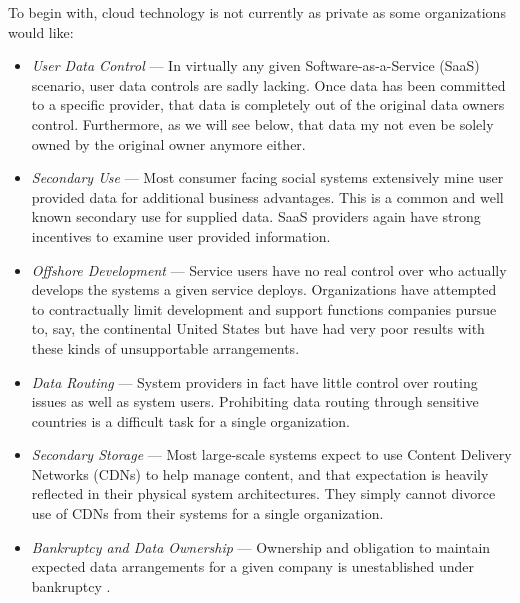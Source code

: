 \documentclass[12pt,letterpaper]{article}
\begin{document}
To begin with, cloud technology is not currently as private as some organizations would like:
\begin{itemize}
\item \textit{User Data Control} --- In virtually any given Software-as-a-Service (SaaS) scenario, user data controls are sadly lacking.  Once data has been committed to a specific provider, that data is completely out of the original data owners control.  Furthermore, as we will see below, that data my not even be solely owned by the original owner anymore either.
\item \textit{Secondary Use} --- Most consumer facing social systems extensively mine user provided data for additional business advantages.  This is a common and well known secondary use for supplied data.  SaaS providers again have strong incentives to examine user provided information.
\item \textit{Offshore Development} --- Service users have no real control over who actually develops the systems a given service deploys.  Organizations have attempted to contractually limit development and support functions companies pursue to, say, the continental United States but have had very poor results with these kinds of unsupportable arrangements.
\item \textit{Data Routing} --- System providers in fact have little control over routing issues as well as system users.  Prohibiting data routing through sensitive countries is a difficult task for a single organization.
\item \textit{Secondary Storage} --- Most large-scale systems expect to use Content Delivery Networks (CDNs) to help manage content, and that expectation is heavily reflected in their physical system architectures. They simply cannot divorce use of CDNs from their systems for a single organization.
\item \textit{Bankruptcy and Data Ownership} --- Ownership and obligation to maintain expected data arrangements for a given company is unestablished under bankruptcy \cite{proposal:borders-info-I,proposal:borders-info-II,proposal:borders-info-III}.
\end{itemize}
\end{document}
